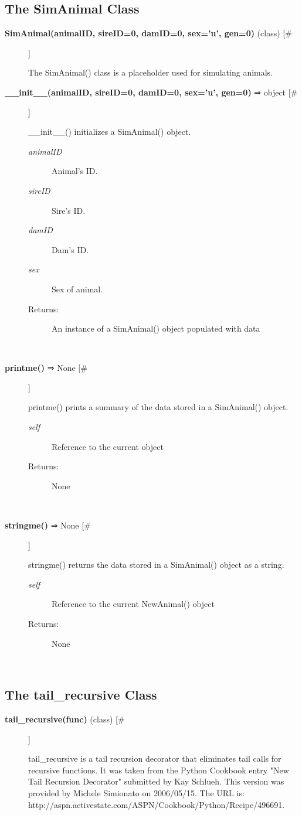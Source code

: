 \subsection*{The SimAnimal Class}
\begin{description}
\item[\textbf{SimAnimal(animalID, sireID=0, damID=0, sex='u', gen=0)} (class) [\#]
]
\par The SimAnimal() class is a placeholder used for simulating animals.

\item[\textbf{\_\_init\_\_(animalID, sireID=0, damID=0, sex='u', gen=0)} ⇒ object [\#]
]
\par \_\_init\_\_() initializes a SimAnimal() object.
\begin{description}
\item[\textit{animalID}
]
Animal's ID.
\item[\textit{sireID}
]
Sire's ID.
\item[\textit{damID}
]
Dam's ID.
\item[\textit{sex}
]
Sex of animal.
\item[Returns:
]
An instance of a SimAnimal() object populated with data
\end{description}\\

\item[\textbf{printme()} ⇒ None [\#]
]
\par printme() prints a summary of the data stored in a SimAnimal() object.
\begin{description}
\item[\textit{self}
]
Reference to the current object
\item[Returns:
]
None
\end{description}\\

\item[\textbf{stringme()} ⇒ None [\#]
]
\par stringme() returns the data stored in a SimAnimal() object as a string.
\begin{description}
\item[\textit{self}
]
Reference to the current NewAnimal() object
\item[Returns:
]
None
\end{description}\\

\end{description}
\subsection*{The tail\_recursive Class}
\begin{description}
\item[\textbf{tail\_recursive(func)} (class) [\#]
]
\par tail\_recursive is a tail recursion decorator that eliminates tail calls
for recursive functions. It was taken from the Python Cookbook entry
"New Tail Recursion Decorator" submitted by Kay Schlueh. This version was
provided by Michele Simionato on 2006/05/15. The URL is:
http://aspn.activestate.com/ASPN/Cookbook/Python/Recipe/496691.

\end{description}
